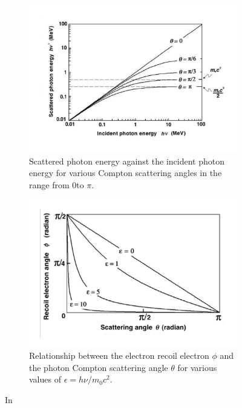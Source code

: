 \begin{figure}
\centering
\begin{subfigure}[t]{.49\textwidth}
\includegraphics[width=1.1\linewidth]{03_GraphicFiles/chapter2_GammaCameras/ComptonEnergy.pdf}
\caption{Scattered photon energy against the incident photon energy for various Compton scattering angles in the range from 0\textdegree to $\pi$.}
\label{chap2::fig::ComptonEnergy}
\end{subfigure}
\begin{subfigure}[t]{.49\textwidth}
\includegraphics[width=1.1\linewidth]{03_GraphicFiles/chapter2_GammaCameras/scattRecoilAnglesCompton.pdf}
\caption{Relationship between the electron recoil electron $\phi$ and the photon Compton scattering angle $\theta$ for various values of $\epsilon = h\nu / m_{0}c^2$.}
\label{chap2::fig::thetaphirel}
\end{subfigure}
\caption{In~\cite{Podgorsak2010}}
\label{chap2::fig::ComptonAngular}
\end{figure}
   
